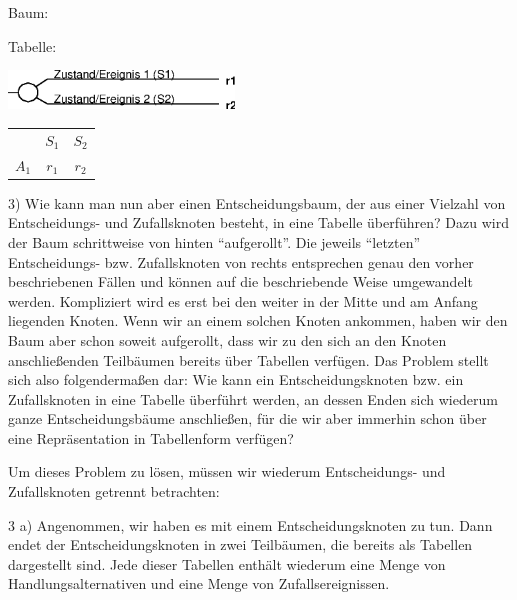 \vspace{0.5cm}

\parbox{7cm}{Baum:}\parbox{5cm}{Tabelle:}

\vspace{0.25cm}

\parbox{7cm}{\includegraphics[width=6cm]{Grafiken/Beispiel1b_2.eps}}
\parbox{5cm}{
\begin{tabular}{c|c|c|}
      & $S_1$ & $S_2$ \\ \cline{1-3}
$A_1$ & $r_1$ & $r_2$ \\ \cline{1-3}
\end{tabular}}

\vspace{0.5cm}

3) Wie kann man nun aber einen Entscheidungsbaum, der aus einer
Vielzahl von Entscheidungs- und Zufallsknoten besteht, in eine Tabelle
überführen? Dazu wird der Baum schrittweise von hinten
"`aufgerollt"'. Die jeweils "`letzten"' Entscheidungs-
bzw. Zufallsknoten von rechts entsprechen genau den vorher
beschriebenen Fällen und können auf die beschriebende Weise
umgewandelt werden.  Kompliziert wird es erst bei den weiter in der
Mitte und am Anfang liegenden Knoten. Wenn wir an einem solchen Knoten
ankommen, haben wir den Baum aber schon soweit aufgerollt, dass wir zu
den sich an den Knoten anschließenden Teilbäumen bereits über Tabellen
verfügen. Das Problem stellt sich also folgendermaßen dar: Wie kann
ein Entscheidungsknoten bzw. ein Zufallsknoten in eine Tabelle
überführt werden, an dessen Enden sich wiederum ganze
Entscheidungsbäume anschließen, für die wir aber immerhin schon über
eine Repräsentation in Tabellenform verfügen?

Um dieses Problem zu lösen, müssen wir wiederum Entscheidungs- und
Zufallsknoten getrennt betrachten:

3 a) Angenommen, wir haben es mit einem Entscheidungsknoten zu tun. Dann endet
der Entscheidungsknoten in zwei Teilbäumen, die bereits als Tabellen
dargestellt sind. Jede dieser Tabellen enthält wiederum eine Menge von
Handlungsalternativen und eine Menge von Zufallsereignissen.

\vspace{0.5cm}

